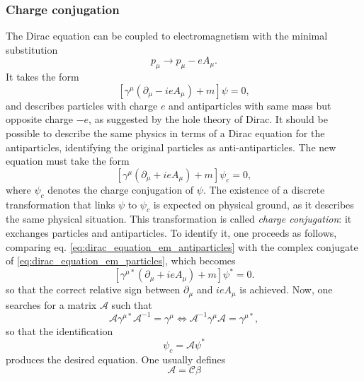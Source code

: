\subsubsection{Charge conjugation}

The Dirac equation can be coupled to electromagnetism with the minimal substitution
\[
    p_\mu \to p_\mu -eA_\mu.
\]
It takes the form
\begin{equation}
    \left[\gamma^{\mu} (\partial_\mu - i e A_\mu) + m \right] \psi = 0,
    \label{eq:dirac_equation_em_particles}
\end{equation}
and describes particles with charge \(e\) and antiparticles with same mass but opposite charge \(-e\), as suggested by the hole theory of Dirac. It should be possible to describe the same physics in terms of a Dirac equation for the antiparticles, identifying the original particles as anti-antiparticles.
The new equation must take the form
\begin{equation}
    \left[\gamma^{\mu} (\partial_\mu + i e A_\mu) + m \right] \psi_c = 0,
    \label{eq:dirac_equation_em_antiparticles}
\end{equation}
where \(\psi_c\) denotes the charge conjugation of \(\psi\). The existence of a discrete transformation that links \(\psi\) to \(\psi_c\) is expected on physical ground, as it describes the same physical situation.
This transformation is called \textit{charge conjugation}: it exchanges particles and antiparticles. To identify it, one proceeds as follows, comparing eq. \eqref{eq:dirac_equation_em_antiparticles} with the complex conjugate of \eqref{eq:dirac_equation_em_particles}, which becomes
\[
    \left[\gamma^{\mu *} (\partial_\mu + i e A_\mu) + m \right] \psi^* = 0.
\]
so that the correct relative sign between \(\partial_\mu\) and \(ieA_\mu\) is achieved. Now, one searches for a matrix \(\mathcal{A}\) such that
\begin{equation}
    \mathcal{A} \gamma^{\mu *} \mathcal{A}^{-1} = \gamma^{\mu} \iff \mathcal{A}^{-1} \gamma^{\mu} \mathcal{A} = \gamma^{\mu *},
    \label{eq:charge_conjugation_gamma_condition_A}
\end{equation}
so that the identification
\begin{equation}
    \psi_c = \mathcal{A} \psi^*
    \label{eq:charge_conjugation_transformation_A}
\end{equation}
produces the desired equation. One usually defines
\begin{equation}
    \mathcal{A} = \mathcal{C} \beta
    \label{eq:charge_conjugation_A_C_relation}
\end{equation}
